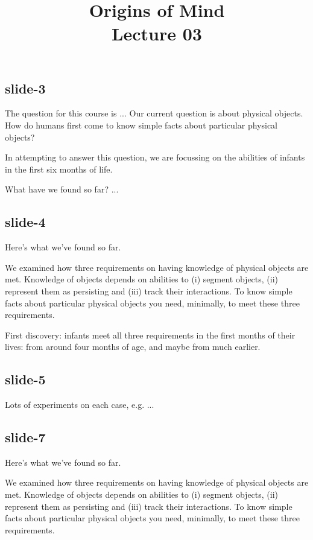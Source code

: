 \documentclass[12pt,\papersize]{extarticle}
\begin{document}
\setlength\footnotesep{1em}









\title {Origins of Mind \\ Lecture 03}



\maketitle

\subsection{slide-3}
The question for this course is ...
Our current question is about physical objects.
How do humans first come to know simple facts about particular physical objects?

In attempting to answer this question, we are focussing on the abilities of
infants in the first six months of life.

What have we found so far? ...

\subsection{slide-4}
Here’s what we’ve found so far.

We examined how three requirements on having knowledge of physical objects are met.
Knowledge of objects depends on abilities to (i) segment objects, (ii) represent them as
persisting and (iii) track their interactions.
To know simple facts about particular physical objects you need, minimally,
to meet these three requirements.

First discovery: infants meet all three requirements in the first months of their lives:
from around four months of age, and maybe from much earlier.

\subsection{slide-5}
Lots of experiments on each case, e.g. ...

\subsection{slide-7}
Here’s what we’ve found so far.

We examined how three requirements on having knowledge of physical objects are met.
Knowledge of objects depends on abilities to (i) segment objects, (ii) represent them as
persisting and (iii) track their interactions.
To know simple facts about particular physical objects you need, minimally,
to meet these three requirements.
\end{document}
